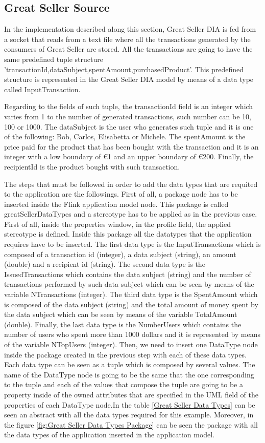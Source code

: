 \subsection{Great Seller Source}

In the implementation described along this section, Great Seller DIA is fed from a socket that reads from a text file where all the transactions generated by the consumers of Great Seller are stored. All the transactions are going to have the same predefined tuple structure 'transactionId,dataSubject,spentAmount,purchasedProduct'. This predefined structure is represented in the Great Seller DIA model by means of a data type called InputTransaction.

Regarding to the fields of such tuple, the transactionId field is an integer which varies from 1 to the number of generated transactions, such number can be 10, 100 or 1000. The dataSubject is the user who generates such tuple and it is one of the following: Bob, Carlos, Elisabetta or Michele. The spentAmount is the price paid for the product that has been bought with the transaction and it is an integer with a low boundary of \euro{1} and an upper boundary of \euro{200}. Finally, the recipientId is the product bought with such transaction.

The steps that must be followed in order to add the data types that are requited to the application are the followings. First of all, a package node has to be inserted inside the Flink application model node. This package is called greatSellerDataTypes and a stereotype has to be applied as in the previous case. First of all, inside the properties window, in the profile field, the applied stereotype is defined. Inside this package all the datatypes that the application requires have to be inserted. The first data type is the InputTransactions which is composed of a transaction id (integer), a data subject (string), an amount (double) and a recipient id (string). The second data type is the IssuedTransactions which contains the data subject (string) and the number of transactions performed by such data subject which can be seen by means of the variable NTransactions (integer). The third data type is the SpentAmount which is composed of the data subject (string) and the total amount of money spent by the data subject which can be seen by means of the variable TotalAmount (double). Finally, the last data type is the NumberUsers which contains the number of users who spent more than 1000 dollars and it is represented by means of the variable NTopUsers (integer). Then, we need to insert one DataType node inside the package created in the previous step with each of these data types. Each data type can be seen as a tuple which is composed by several values. The name of the DataType node is going to be the same that the one corresponding to the tuple and each of the values that compose the tuple are going to be a property inside of the owned attributes that are specified in the UML field of the properties of each DataType node.In the table \ref{Great Seller Data Types} can be seen an abstract with all the data types required for this example. Moreover, in the figure \ref{fig:Great Seller Data Types Package} can be seen the package with all the data types of the application inserted in the application model.


